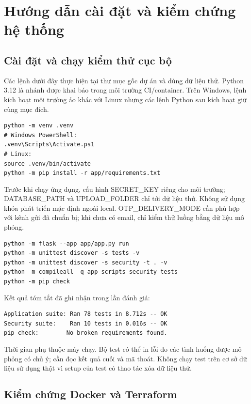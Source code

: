 \chapter{Hướng dẫn cài đặt và kiểm chứng hệ thống}
\section{Cài đặt và chạy kiểm thử cục bộ}
Các lệnh dưới đây thực hiện tại thư mục gốc dự án và dùng dữ liệu thử. Python 3.12 là nhánh được khai báo trong môi trường CI/container. Trên Windows, lệnh kích hoạt môi trường ảo khác với Linux nhưng các lệnh Python sau kích hoạt giữ cùng mục đích.
\begin{verbatim}
python -m venv .venv
# Windows PowerShell:
.venv\Scripts\Activate.ps1
# Linux:
source .venv/bin/activate
python -m pip install -r app/requirements.txt
\end{verbatim}
Trước khi chạy ứng dụng, cấu hình SECRET\_KEY riêng cho môi trường; DATABASE\_PATH và UPLOAD\_FOLDER chỉ tới dữ liệu thử. Không sử dụng khóa phát triển mặc định ngoài local. OTP\_DELIVERY\_MODE cần phù hợp với kênh gửi đã chuẩn bị; khi chưa có email, chỉ kiểm thử luồng bằng dữ liệu mô phỏng.
\begin{verbatim}
python -m flask --app app/app.py run
python -m unittest discover -s tests -v
python -m unittest discover -s security -t . -v
python -m compileall -q app scripts security tests
python -m pip check
\end{verbatim}
Kết quả tóm tắt đã ghi nhận trong lần đánh giá:
\begin{verbatim}
Application suite: Ran 78 tests in 8.712s -- OK
Security suite:    Ran 10 tests in 0.016s -- OK
pip check:        No broken requirements found.
\end{verbatim}
Thời gian phụ thuộc máy chạy. Bộ test có thể in lỗi do các tình huống được mô phỏng có chủ ý; cần đọc kết quả cuối và mã thoát. Không chạy test trên cơ sở dữ liệu sử dụng thật vì setup của test có thao tác xóa dữ liệu thử.

\section{Kiểm chứng Docker và Terraform}
